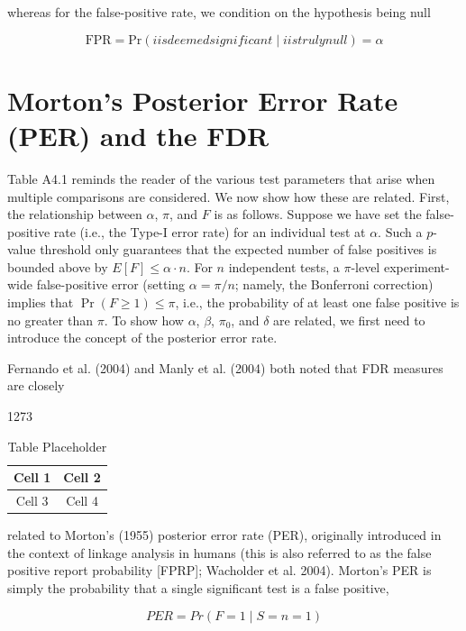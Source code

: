 \documentclass{article}
\begin{document}
whereas for the false-positive rate, we condition on the hypothesis being null

\begin{equation}
\mathrm{FPR}=\mathrm{Pr}(i is deemed significant\mid i is truly null)=\alpha
\end{equation}

\section{Morton's Posterior Error Rate (PER) and the FDR}
Table A4.1 reminds the reader of the various test parameters that arise when multiple comparisons are considered. We now show how these are related. First, the relationship between  $ \alpha $,  $ \pi $, and  $ F $ is as follows. Suppose we have set the false-positive rate (i.e., the Type-I error rate) for an individual test at  $ \alpha $. Such a  $ p $-value threshold only guarantees that the expected number of false positives is bounded above by  $ E[F] \leq \alpha \cdot n $. For  $ n $ independent tests, a  $ \pi $-level experiment-wide false-positive error (setting  $ \alpha = \pi/n $; namely, the Bonferroni correction) implies that  $ \Pr(F \geq 1) \leq \pi $, i.e., the probability of at least one false positive is no greater than  $ \pi $. To show how  $ \alpha $,  $ \beta $,  $ \pi_0 $, and  $ \delta $ are related, we first need to introduce the concept of the posterior error rate.

Fernando et al. (2004) and Manly et al. (2004) both noted that FDR measures are closely

1273

\begin{table}[h]
\centering
\begin{tabular}{|c|c|}
\hline
Cell 1 & Cell 2 \\
\hline
Cell 3 & Cell 4 \\
\hline
\end{tabular}
\caption{Table Placeholder}
\end{table}

related to Morton’s (1955) posterior error rate (PER), originally introduced in the context of linkage analysis in humans (this is also referred to as the false positive report probability [FPRP]; Wacholder et al. 2004). Morton’s PER is simply the probability that a single significant test is a false positive,

\begin{equation}
PER=Pr(F=1\mid S=n=1)
\end{equation}
\end{document}
